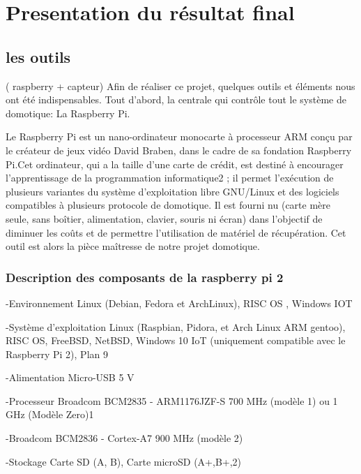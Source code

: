 \newpage
\tableofcontents
\clearpage

%
\section*{Presentation du résultat final}
\subsection*{les outils} ( raspberry + capteur) 
Afin de réaliser ce projet, quelques outils et éléments nous ont été indispensables. Tout d'abord, la centrale qui contrôle tout le système de domotique: La Raspberry Pi.

Le Raspberry Pi est un nano-ordinateur monocarte à processeur ARM conçu par le créateur de jeux vidéo David Braben, dans le cadre de sa fondation Raspberry Pi.Cet ordinateur, qui a la taille d'une carte de crédit, est destiné à encourager l'apprentissage de la programmation informatique2 ; il permet l'exécution de plusieurs variantes du système d'exploitation libre GNU/Linux et des logiciels compatibles à plusieurs protocole de domotique. Il est fourni nu (carte mère seule, sans boîtier, alimentation, clavier, souris ni écran) dans l'objectif de diminuer les coûts et de permettre l'utilisation de matériel de récupération. Cet outil est alors la pièce maîtresse de notre projet domotique. 
\subsubsection{Description des composants de la raspberry pi 2}
-Environnement 	Linux (Debian, Fedora et ArchLinux), RISC OS , Windows IOT


-Système d'exploitation 	Linux (Raspbian, Pidora, et Arch Linux ARM gentoo), RISC OS, FreeBSD, NetBSD, Windows 10 IoT (uniquement compatible avec le Raspberry Pi 2), Plan 9


-Alimentation 	Micro-USB 5 V


-Processeur 	Broadcom BCM2835 - ARM1176JZF-S 700 MHz (modèle 1) ou 1 GHz (Modèle Zero)1


-Broadcom BCM2836 - Cortex-A7 900 MHz (modèle 2)


-Stockage 	Carte SD (A, B), Carte microSD (A+,B+,2)


